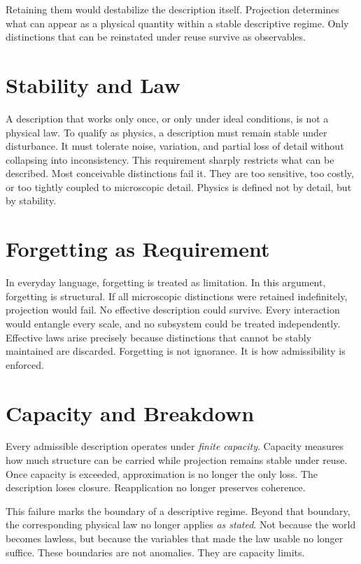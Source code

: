 \documentclass[11pt,twoside,openright]{book}
\begin{document}
Retaining them would destabilize the description itself. Projection determines what can appear as a physical quantity within a stable descriptive regime. Only distinctions that can be reinstated under reuse survive as observables.

\section*{Stability and Law}

A description that works only once, or only under ideal conditions, is not a physical law. To qualify as physics, a description must remain stable under disturbance. It must tolerate noise, variation, and partial loss of detail without collapsing into inconsistency. This requirement sharply restricts what can be described. Most conceivable distinctions fail it. They are too sensitive, too costly, or too tightly coupled to microscopic detail. Physics is defined not by detail, but by stability.

\section*{Forgetting as Requirement}

In everyday language, forgetting is treated as limitation. In this argument, forgetting is structural. If all microscopic distinctions were retained indefinitely, projection would fail. No effective description could survive. Every interaction would entangle every scale, and no subsystem could be treated independently. Effective laws arise precisely because distinctions that cannot be stably maintained are discarded. Forgetting is not ignorance. It is how admissibility is enforced.

\section*{Capacity and Breakdown}

Every admissible description operates under \emph{finite capacity}. Capacity measures how much structure can be carried while projection remains stable under reuse. Once capacity is exceeded, approximation is no longer the only loss. The description loses closure. Reapplication no longer preserves coherence.

This failure marks the boundary of a descriptive regime. Beyond that boundary, the corresponding physical law no longer applies \emph{as stated}. Not because the world becomes lawless, but because the variables that made the law usable no longer suffice. These boundaries are not anomalies. They are capacity limits.
\end{document}
